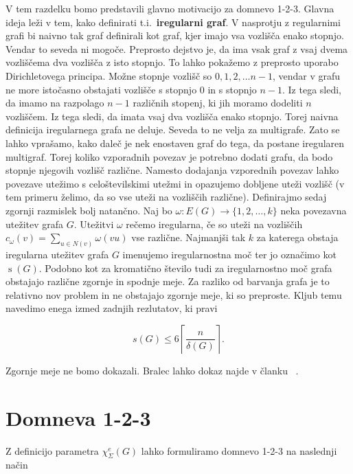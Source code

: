 \documentclass[12pt,a4paper,twoside]{article}
\theoremstyle{definition} %
\theoremstyle{plain} %
\newcommand{\ec}{\chi_{\Sigma}^e}
\numberwithin{equation}{section}  %
\DeclareMathOperator{\s}{s}
\begin{document}
V tem razdelku bomo predstavili glavno motivacijo za domnevo 1-2-3. Glavna ideja leži v tem, kako definirati t.i.\ \textbf{iregularni graf}. V nasprotju z regularnimi grafi bi naivno tak graf definirali kot graf, kjer imajo vsa vozlišča enako stopnjo. Vendar to seveda ni mogoče. Preprosto dejstvo je, da ima vsak graf z vsaj dvema vozliščema dva vozlišča z isto stopnjo. To lahko pokažemo z preprosto uporabo Dirichletovega principa. Možne stopnje vozlišč so $0, 1, 2, \ldots n-1$, vendar v grafu ne more istočasno obstajati vozlišče s stopnjo $0$ in s stopnjo $n-1$. Iz tega sledi, da imamo na razpolago $n-1$ različnih stopenj, ki jih moramo dodeliti $n$ vozliščem. Iz tega sledi, da imata vsaj dva vozlišča enako stopnjo. Torej naivna definicija iregularnega grafa ne deluje. Seveda to ne velja za multigrafe. Zato se lahko vprašamo, kako daleč je nek enostaven graf do tega, da postane iregularen multigraf. Torej koliko vzporadnih povezav je potrebno dodati grafu, da bodo stopnje njegovih vozlišč različne. Namesto dodajanja vzporednih povezav lahko povezave utežimo s celoštevilskimi utežmi in opazujemo dobljene uteži vozlišč (v tem primeru želimo, da so vse uteži na vozliščih različne). Definirajmo sedaj zgornji razmislek bolj natančno. Naj bo $\omega : E(G) \rightarrow \{1,2, \ldots, k\}$ neka povezavna utežitev grafa $G$. Utežitvi $\omega$ rečemo iregularna, če so uteži na vozliščih $ c_{\omega}(v) =  \sum_{u \in N(v)} \omega(vu)$ vse različne. Najmanjši tak $k$ za katerega obstaja iregularna utežitev grafa $G$ imenujemo iregularnostna moč ter jo označimo kot $\s(G)$. Podobno kot za kromatično število tudi za iregularnostno moč grafa obstajajo različne zgornje in spodnje meje. Za razliko od barvanja grafa je to relativno nov problem in ne obstajajo zgornje meje, ki so preproste. Kljub temu navedimo enega izmed zadnjih rezlutatov, ki pravi 

$$  s(G) \le 6 \left \lceil \frac{n}{\delta(G)} \right \rceil.$$

Zgornje meje ne bomo dokazali. Bralec lahko dokaz najde v članku ~\cite{irregular}.



\section{Domneva 1-2-3}
Z definicijo parametra $\ec(G)$ lahko formuliramo domnevo 1-2-3 na naslednji način
\end{document}
